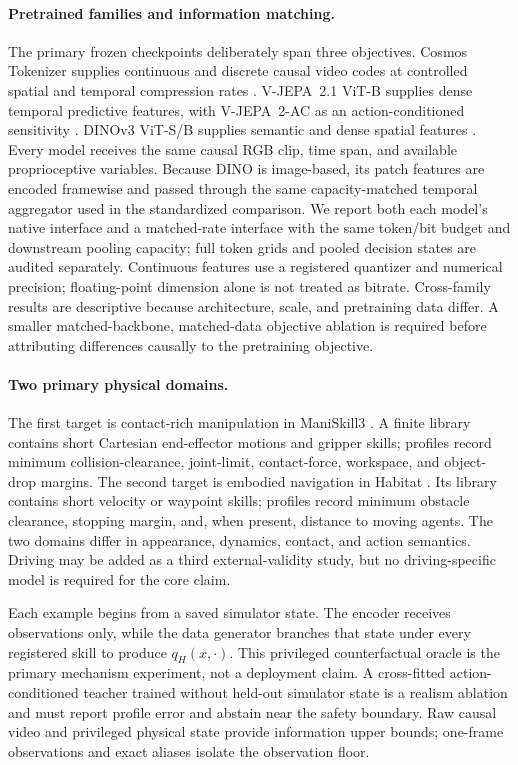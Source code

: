 \paragraph{Pretrained families and information matching.}
The primary frozen checkpoints deliberately span three objectives.  Cosmos Tokenizer supplies
continuous and discrete causal video codes at controlled spatial and temporal compression rates
\citep{nvidia2025cosmos,nvidia2025cosmostokenizer}.  V-JEPA~2.1 ViT-B supplies dense temporal
predictive features, with V-JEPA~2-AC as an action-conditioned sensitivity
\citep{assran2025vjepa2,murlabadia2026vjepa21}.  DINOv3 ViT-S/B supplies semantic and dense spatial
features \citep{simeoni2025dinov3}.  Every model receives the same causal RGB clip, time span, and
available proprioceptive variables.  Because DINO is image-based, its patch features are encoded
framewise and passed through the same capacity-matched temporal aggregator used in the standardized
comparison.  We report both each model's native interface and a matched-rate interface with the
same token/bit budget and downstream pooling capacity; full token grids and pooled decision states
are audited separately.  Continuous features use a registered quantizer and numerical precision;
floating-point dimension alone is not treated as bitrate.  Cross-family results are descriptive
because architecture, scale, and pretraining data differ.  A smaller matched-backbone, matched-data
objective ablation is required
before attributing differences causally to the pretraining objective.

\paragraph{Two primary physical domains.}
The first target is contact-rich manipulation in ManiSkill3
\citep{tao2025maniskill3}.  A finite library contains short Cartesian end-effector motions and
gripper skills; profiles record minimum collision-clearance, joint-limit, contact-force, workspace,
and object-drop margins.  The second target is embodied navigation in Habitat
\citep{savva2019habitat}.  Its library contains short velocity or waypoint skills; profiles record
minimum obstacle clearance, stopping margin, and, when present, distance to moving agents.  The two
domains differ in appearance, dynamics, contact, and action semantics.  Driving may be added as a
third external-validity study, but no driving-specific model is required for the core claim.

Each example begins from a saved simulator state.  The encoder receives observations only, while
the data generator branches that state under every registered skill to produce $q_H(x,\cdot)$.
This privileged counterfactual oracle is the primary mechanism experiment, not a deployment claim.
A cross-fitted action-conditioned teacher trained without held-out simulator state is a realism
ablation and must report profile error and abstain near the safety boundary.  Raw causal video and
privileged physical state provide information upper bounds; one-frame observations and exact aliases
isolate the observation floor.

